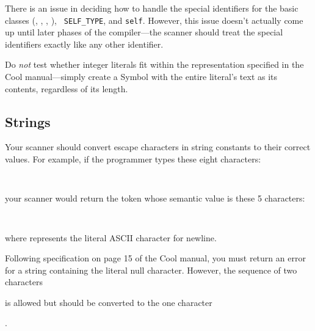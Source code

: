 \documentclass[11pt]{article}
\begin{document}


There is an issue in deciding how to handle the special identifiers for
the basic classes (, , , ), {\tt
SELF\_TYPE}, and {\tt self}.  However, this issue doesn't actually come
up until later phases of the compiler---the scanner should treat the
special identifiers exactly like any other identifier.

Do \emph{not} test whether integer literals fit within the
representation specified in the Cool manual---simply create a Symbol
with the entire literal's text as its contents, regardless of its
length.

\subsection{Strings}

Your scanner should convert escape characters in string constants to their
correct values.  For example, if the programmer types these eight
characters:
\begin{center}
{\tt
  \Char{$\backslash$}
}
\end{center}
your scanner would return the token  whose semantic value
is these 5 characters:
\begin{center}
{\tt
}
\end{center}
where  represents the literal ASCII character for
newline.

Following specification on page 15 of the Cool manual, you must return
an error for a string containing the literal null character. However,
the sequence of two characters
\begin{center}
{\tt\Char{$\backslash$}}
\end{center}
is allowed but should be converted to the one character
\begin{center}
{\tt{}}.
\end{center}
\end{document}
